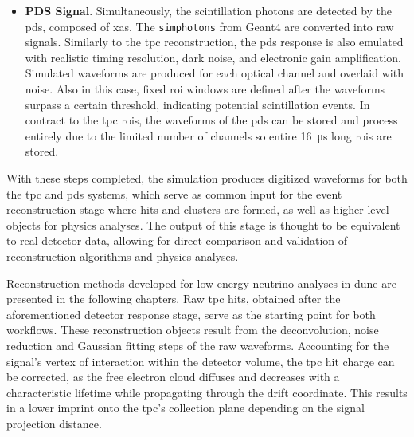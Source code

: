 \begin{itemize}
    \item{\textbf{PDS Signal}}.
    Simultaneously, the scintillation photons are detected by the \gls{pds}, composed of \gls{xa}s. The \texttt{simphotons} from Geant4 are converted into raw signals. Similarly to the \gls{tpc} reconstruction, the \gls{pds} response is also emulated with realistic timing resolution, dark noise, and electronic gain amplification. Simulated waveforms are produced for each optical channel and overlaid with noise. Also in this case, fixed \gls{roi} windows are defined after the waveforms surpass a certain threshold, indicating potential scintillation events. In contract to the \gls{tpc} \gls{roi}s, the waveforms of the \gls{pds} can be stored and process entirely due to the limited number of channels so entire \SI{16}{\micro\second} long \gls{roi}s are stored.
\end{itemize}

With these steps completed, the simulation produces digitized waveforms for both the \gls{tpc} and \gls{pds} systems, which serve as common input for the event reconstruction stage where hits and clusters are formed, as well as higher level objects for physics analyses. The output of this stage is thought to be equivalent to real detector data, allowing for direct comparison and validation of reconstruction algorithms and physics analyses.

Reconstruction methods developed for low-energy neutrino analyses in \gls{dune} are presented in the following chapters. Raw \gls{tpc} hits, obtained after the aforementioned detector response stage, serve as the starting point for both workflows. These reconstruction objects result from the deconvolution, noise reduction and Gaussian fitting steps of the raw waveforms. Accounting for the signal's vertex of interaction within the detector volume, the \gls{tpc} hit charge can be corrected, as the free electron cloud diffuses and decreases with a characteristic lifetime while propagating through the drift coordinate. This results in a lower imprint onto the \gls{tpc}'s collection plane depending on the signal projection distance.

